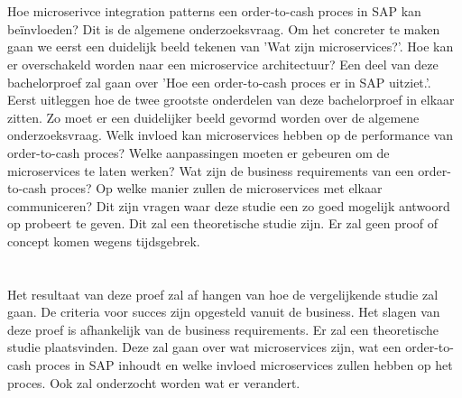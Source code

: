 \section{}
\label{sec:onderzoeksvraag}
Hoe microserivce integration patterns een order-to-cash proces in SAP kan beïnvloeden? Dit is de algemene onderzoeksvraag. Om het concreter te maken gaan we eerst een duidelijk beeld tekenen van 'Wat zijn microservices?'. Hoe kan er overschakeld worden naar een microservice architectuur? Een deel van deze bachelorproef zal gaan over 'Hoe een order-to-cash proces er in SAP uitziet.'. Eerst uitleggen hoe de twee grootste onderdelen van deze bachelorproef in elkaar zitten. Zo moet er een duidelijker beeld gevormd worden over de algemene onderzoeksvraag. Welk invloed kan microservices hebben op de performance van order-to-cash proces? Welke aanpassingen moeten er gebeuren om de microservices te laten werken? Wat zijn de business requirements van een order-to-cash proces? Op welke manier zullen de microservices met elkaar communiceren? Dit zijn vragen waar deze studie een zo goed mogelijk antwoord op probeert te geven. Dit zal een theoretische studie zijn. Er zal geen proof of concept komen wegens tijdsgebrek. 

\section{}
\label{sec:onderzoeksdoelstelling}
Het resultaat van deze proef zal af hangen van hoe de vergelijkende studie zal gaan. De criteria voor succes zijn opgesteld vanuit de business. Het slagen van deze proef is afhankelijk van de business requirements. Er zal een theoretische studie plaatsvinden. Deze zal gaan over wat microservices zijn, wat een order-to-cash proces in SAP inhoudt en welke invloed microservices zullen hebben op het proces. Ook zal onderzocht worden wat er verandert.

\section{}
\label{sec:opzet-bachelorproef}


